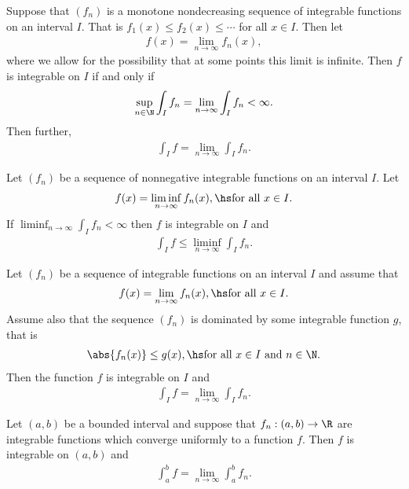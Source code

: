 \documentclass{article}
\begin{document}
\begin{theorem}
	Suppose that $(f_n)$ is a monotone nondecreasing sequence of integrable functions on an interval $I$. That is
	$f_1(x) \leq f_2(x) \leq \cdots$ for all $x\in I$. Then let
	\begin{align*}
		f(x) = \lim_{n\to\infty}f_n(x),
	\end{align*}
	where we allow for the possibility that at some points this limit is infinite. Then $f$ is integrable on $I$
	if and only if
	\begin{align*}
		\sup_{n\in\N}\int_I f_n = \lim_{n\to\infty}\int_I f_n < \infty.
	\end{align*}
	Then further,
	\begin{align*}
		\int_I f = \lim_{n\to\infty} \int_I f_n.
	\end{align*}
\end{theorem}

\begin{lemma}
	Let $(f_n)$ be a sequence of nonnegative integrable functions on an interval $I$. Let
	\begin{align*}
		f(x) = \liminf_{n\to\infty} f_n(x), \hs\text{for all $x\in I$}.
	\end{align*}
	If $\liminf_{n\to\infty}\int_I f_n<\infty$ then $f$ is integrable on $I$ and
	\begin{align*}
		\int_I f \leq \liminf_{n\to\infty} \int_I f_n.
	\end{align*}
\end{lemma}

\begin{theorem}
	Let $(f_n)$ be a sequence of integrable functions on an interval $I$ and assume that
	\begin{align*}
		f(x) = \lim_{n\to\infty} f_n(x), \hs \text{for all $x\in I$}.
	\end{align*}
	Assume also that the sequence $(f_n)$ is dominated by some integrable function $g$, that is
	\begin{align*}
		\abs{f_n(x)} \leq g(x), \hs \text{for all $x\in I$ and $n\in\N$.}
	\end{align*}
	Then the function $f$ is integrable on $I$ and
	\begin{align*}
		\int_I f = \lim_{n\to\infty} \int_I f_n.
	\end{align*}
\end{theorem}

\begin{theorem}[Notes 4.13]
	Let $(a,b)$ be a bounded interval and suppose that $f_n:(a,b)\to\R$ are integrable functions
	which converge uniformly to a function $f$. Then $f$ is integrable on $(a,b)$ and
	\begin{align*}
		\int_a^b f = \lim_{n\to\infty} \int_a^b f_n.
	\end{align*}
\end{theorem}
\end{document}
